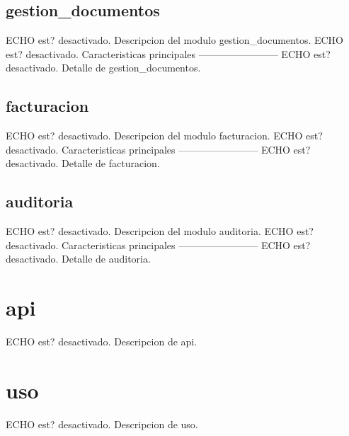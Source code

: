 \documentclass[letterpaper,10pt,spanish]{sphinxmanual}
\begin{document}
\sphinxstepscope


\subsection{gestion\_documentos}
\label{\detokenize{modulos/gestion_documentos:gestion-documentos}}\label{\detokenize{modulos/gestion_documentos::doc}}
\sphinxAtStartPar
ECHO est? desactivado.
Descripcion del modulo gestion\_documentos.
ECHO est? desactivado.
Caracteristicas principales
————————\textendash{}
ECHO est? desactivado.
\sphinxhyphen{} Detalle de gestion\_documentos.

\sphinxstepscope


\subsection{facturacion}
\label{\detokenize{modulos/facturacion:facturacion}}\label{\detokenize{modulos/facturacion::doc}}
\sphinxAtStartPar
ECHO est? desactivado.
Descripcion del modulo facturacion.
ECHO est? desactivado.
Caracteristicas principales
————————\textendash{}
ECHO est? desactivado.
\sphinxhyphen{} Detalle de facturacion.

\sphinxstepscope


\subsection{auditoria}
\label{\detokenize{modulos/auditoria:auditoria}}\label{\detokenize{modulos/auditoria::doc}}
\sphinxAtStartPar
ECHO est? desactivado.
Descripcion del modulo auditoria.
ECHO est? desactivado.
Caracteristicas principales
————————\textendash{}
ECHO est? desactivado.
\sphinxhyphen{} Detalle de auditoria.

\sphinxstepscope


\section{api}
\label{\detokenize{api:api}}\label{\detokenize{api::doc}}
\sphinxAtStartPar
ECHO est? desactivado.
Descripcion de api.

\sphinxstepscope


\section{uso}
\label{\detokenize{uso:uso}}\label{\detokenize{uso::doc}}
\sphinxAtStartPar
ECHO est? desactivado.
Descripcion de uso.
\end{document}
